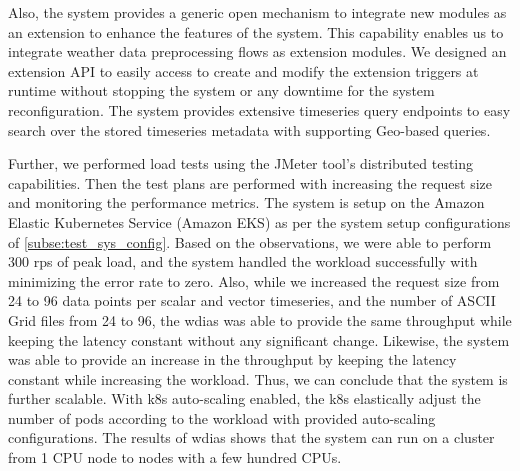 Also, the system provides a generic open mechanism to integrate new modules as an extension to enhance the features of the system. This capability enables us to integrate weather data preprocessing flows as extension modules.
We designed an extension API to easily access to create and modify the extension triggers at runtime without stopping the system or any downtime for the system reconfiguration. The system provides extensive timeseries query endpoints to easy search over the stored timeseries metadata with supporting Geo-based queries.

Further, we performed load tests using the JMeter tool’s distributed testing capabilities. Then the test plans are performed with increasing the request size and monitoring the performance metrics. The system is setup on the Amazon Elastic Kubernetes Service (Amazon EKS) as per the system setup configurations of \cref{subse:test_sys_config}. Based on the observations, we were able to perform 300 \acrshort{rps} of peak load, and the system handled the workload successfully with minimizing the error rate to zero. Also, while we increased the request size from 24 to 96 data points per scalar and vector timeseries, and the number of ASCII Grid files from 24 to 96, the \acrshort{wdias} was able to provide the same throughput while keeping the latency constant without any significant change. Likewise, the system was able to provide an increase in the throughput by keeping the latency constant while increasing the workload. Thus, we can conclude that the system is further scalable.
With \acrshort{k8s} auto-scaling enabled, the \acrshort{k8s} elastically adjust the number of pods according to the workload with provided auto-scaling configurations. The results of \acrshort{wdias} shows that the system can run on a cluster from 1 CPU node to nodes with a few hundred CPUs.
